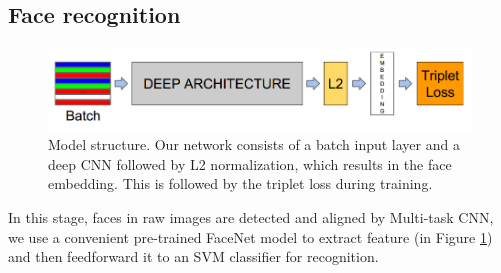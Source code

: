 \documentclass[journal, twocolumn]{IEEEtran}
\begin{document}
\subsection{Face recognition}
\label{face-recognition}
\begin{figure}
    \centering
    \includegraphics[width=1\linewidth]{img/pipeline.png}
	\caption{Model structure. Our network consists of a batch input layer and a deep CNN 
followed by L2 normalization, which results in the face embedding. This is followed by the triplet loss during training.}\label{fig:pipeline}
\end{figure}

In this stage, faces in raw images are detected and aligned by Multi-task CNN, we use a convenient pre-trained FaceNet model to extract feature (in Figure \ref{fig:pipeline}) and then feedforward it to an SVM classifier for recognition. 


\end{document}
